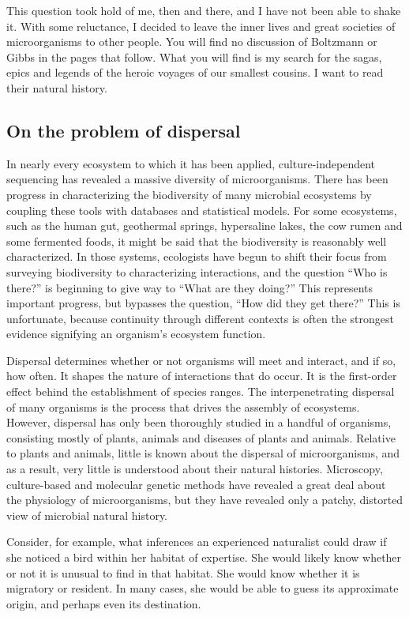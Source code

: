 This question took hold of me, then and there, and I have not been able to shake it. With some reluctance, I decided to leave the inner lives and great societies of microorganisms to other people. You will find no discussion of Boltzmann or Gibbs in the pages that follow. What you will find is my search for the sagas, epics and legends of the heroic voyages of our smallest cousins. I want to read their natural history.

\subsection*{On the problem of dispersal}

In nearly every ecosystem to which it has been applied, culture-independent sequencing has revealed a massive diversity of microorganisms. There has been progress in characterizing the biodiversity of many microbial ecosystems by coupling these tools with databases and statistical models. For some ecosystems, such as the human gut, geothermal springs, hypersaline lakes, the cow rumen and some fermented foods, it might be said that the biodiversity is reasonably well characterized. In those systems, ecologists have begun to shift their focus from surveying biodiversity to characterizing interactions, and the question ``Who is there?'' is beginning to give way to ``What are they doing?'' This represents important progress, but bypasses the question, ``How did they get there?'' This is unfortunate, because continuity through different contexts is often the strongest evidence signifying an organism's ecosystem function.

Dispersal determines whether or not organisms will meet and interact, and if so, how often. It shapes the nature of interactions that do occur. It is the first-order effect behind the establishment of species ranges. The interpenetrating dispersal of many organisms is the process that drives the assembly of ecosystems. However, dispersal has only been thoroughly studied in a handful of organisms, consisting mostly of plants, animals and diseases of plants and animals. Relative to plants and animals, little is known about the dispersal of microorganisms, and as a result, very little is understood about their natural histories. Microscopy, culture-based and molecular genetic methods have revealed a great deal about the physiology of microorganisms, but they have revealed only a patchy, distorted view of microbial natural history.

Consider, for example, what inferences an experienced naturalist could draw if she noticed a bird within her habitat of expertise. She would likely know whether or not it is unusual to find in that habitat. She would know whether it is migratory or resident. In many cases, she would be able to guess its approximate origin, and perhaps even its destination.

